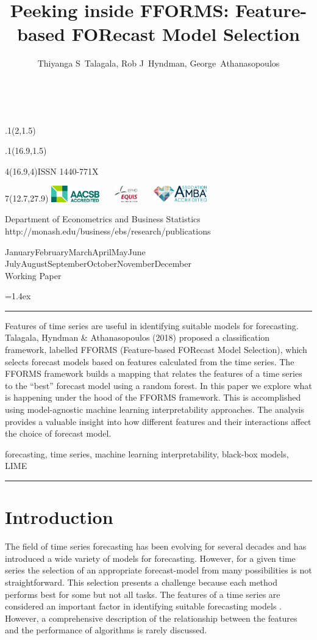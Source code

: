 \documentclass[11pt,a4paper,]{article}
\title{Peeking inside FFORMS: Feature-based FORecast Model Selection}
\author{Thiyanga S~Talagala, Rob J~Hyndman, George~Athanasopoulos}
\date{\sf\Date~\Month~\Year}
\makeatletter
\def\Date{\number\day}
\def\Month{\ifcase\month\or
 January\or February\or March\or April\or May\or June\or
 July\or August\or September\or October\or November\or December\fi}
\def\Year{\number\year}
\def\showjel{{\large\textsf{\textbf{JEL classification:}}~\@jel}}
\def\cover{{\sffamily\setcounter{page}{0}
        \thispagestyle{empty}
        \placefig{2}{1.5}{width=5cm}{monash2}
        \placefig{16.9}{1.5}{width=2.1cm}{MBusSchool}
        \begin{textblock}{4}(16.9,4)ISSN 1440-771X\end{textblock}
        \begin{textblock}{7}(12.7,27.9)\hfill
        \includegraphics[height=0.7cm]{AACSB}~~~
        \includegraphics[height=0.7cm]{EQUIS}~~~
        \includegraphics[height=0.7cm]{AMBA}
        \end{textblock}
        \vspace*{2cm}
        \begin{center}\Large
        Department of Econometrics and Business Statistics\\[.5cm]
        \footnotesize http://monash.edu/business/ebs/research/publications
        \end{center}\vspace{2cm}
        \begin{center}
        \fbox{\parbox{14cm}{\begin{onehalfspace}\centering\Huge\vspace*{0.3cm}
                \textsf{\textbf{\expandafter{\@title}}}\vspace{1cm}\par
                \LARGE\@author\end{onehalfspace}
        }}
        \end{center}
        \vfill
                \begin{center}\Large
                \Month~\Year\\[1cm]
                Working Paper \@wp
        \end{center}\vspace*{2cm}}}
\def\pageone{{\sffamily\setstretch{1}%
        \thispagestyle{empty}%
        \vbox to \textheight{%
        \raggedright\baselineskip=1.2cm
     {\fontsize{24.88}{30}\sffamily\textbf{\expandafter{\@title}}}
        \vspace{2cm}\par
        \hspace{1cm}\parbox{14cm}{\sffamily\large\@addresses}\vspace{1cm}\vfill
        \hspace{1cm}{\large\Date~\Month~\Year}\\[1cm]
        \hspace{1cm}\showjel\vss}}}
\def\blindtitle{{\sffamily
     \thispagestyle{plain}\raggedright\baselineskip=1.2cm
     {\fontsize{24.88}{30}\sffamily\textbf{\expandafter{\@title}}}\vspace{1cm}\par
        }}
\def\titlepage{{\cover\newpage\pageone\newpage\blindtitle}}
\let\maketitle\titlepage
\newenvironment{keywords}{\par\vspace{0.5cm}\noindent{\sffamily\textbf{Keywords:}}}{\vspace{0.25cm}\par\hrule\vspace{0.5cm}\par}
\renewenvironment{abstract}{\begin{minipage}{\textwidth}\parskip=1.4ex\noindent
\hrule\vspace{0.1cm}\par{\sffamily\textbf{\abstractname}}\newline}
  {\end{minipage}}
\def\placefig#1#2#3#4{\begin{textblock}{.1}(#1,#2)\rlap{\texttt{[image: \#4]}}\end{textblock}}
\makeatother
\begin{document}
\maketitle
\begin{abstract}
Features of time series are useful in identifying suitable models for forecasting. Talagala, Hyndman \& Athanasopoulos (2018) proposed a classification framework, labelled FFORMS (Feature-based FORecast Model Selection), which selects forecast models based on features calculated from the time series. The FFORMS framework builds a mapping that relates the features of a time series to the ``best'' forecast model using a random forest. In this paper we explore what is happening under the hood of the FFORMS framework. This is accomplished using model-agnostic machine learning interpretability approaches. The analysis provides a valuable insight into how different features and their interactions affect the choice of forecast model.
\end{abstract}
\begin{keywords}
forecasting, time series, machine learning interpretability, black-box models, LIME
\end{keywords}

\hypertarget{intro}{%
\section{Introduction}\label{intro}}

The field of time series forecasting has been evolving for several decades and has introduced a wide variety of models for forecasting. However, for a given time series the selection of an appropriate forecast-model from many possibilities is not straightforward. This selection presents a challenge because each method performs best for some but not all tasks. The features of a time series are considered an important factor in identifying suitable forecasting models \autocites{collopy1992rule}{meade2000evidence}{makridakis2000m3}{wang2009rule}. However, a comprehensive description of the relationship between the features and the performance of algorithms is rarely discussed.
\end{document}
